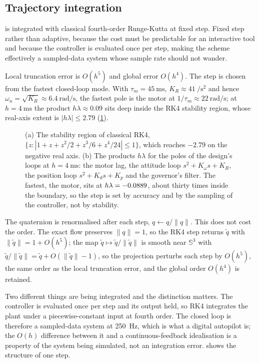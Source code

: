 \subsection{Trajectory integration}

 is integrated with classical fourth-order Runge-Kutta at fixed
step. Fixed step rather than adaptive, because the cost must be predictable for
an interactive tool and because the controller is evaluated once per step,
making the scheme effectively a sampled-data system whose sample rate should
not wander.

Local truncation error is $O(h^5)$ and global error $O(h^4)$. The step is
chosen from the fastest closed-loop mode. With $\tau_m=\SI{45}{\milli\second}$,
$K_R\approx\SI{41}{\per\second\squared}$ and hence
$\omega_n=\sqrt{K_R}\approx\SI{6.4}{\radian\per\second}$, the fastest pole is
the motor at $1/\tau_m\approx\SI{22}{\radian\per\second}$; at
$h=\SI{4}{\milli\second}$ the product $h\lambda\approx0.09$ sits deep inside the
RK4 stability region, whose real-axis extent is $|h\lambda|\le2.79$
(\cref{fig:rk4}).

\begin{figure}[tbp]
\centering

\caption{(a) The stability region of classical RK4,
$\{z:|1+z+z^2/2+z^3/6+z^4/24|\le1\}$, which reaches $-2.79$ on the negative
real axis. (b) The products $h\lambda$ for the poles of the design's loops at
$h=\SI{4}{\milli\second}$: the motor lag, the attitude loop
$s^2+K_\omega s+K_R$, the position loop $s^2+K_ds+K_p$ and the governor's
filter. The fastest, the motor, sits at $h\lambda=-0.0889$, about thirty
times inside the boundary, so the step is set by accuracy and by the sampling
of the controller, not by stability.}
\label{fig:rk4}
\end{figure}

The quaternion is renormalised after each step, $q\leftarrow q/\|q\|$. This
does not cost the order. The exact flow preserves $\|q\|=1$, so the RK4 step
returns $\tilde q$ with $\|\tilde q\| = 1+O(h^5)$; the map
$\tilde q\mapsto\tilde q/\|\tilde q\|$ is smooth near $\mathbb{S}^3$ with
$\tilde q/\|\tilde q\| = \tilde q + O(\|\tilde q\|-1)$, so the projection
perturbs each step by $O(h^5)$, the same order as the local truncation error,
and the global order $O(h^4)$ is retained.

Two different things are being integrated and the distinction matters. The
controller is evaluated once per step and its output held, so RK4 integrates
the plant under a piecewise-constant input at fourth order. The closed loop is
therefore a sampled-data system at \SI{250}{\hertz}, which is what a digital
autopilot is; the $O(h)$ difference between it and a continuous-feedback
idealisation is a property of the system being simulated, not an integration
error.  shows the structure of one step.

